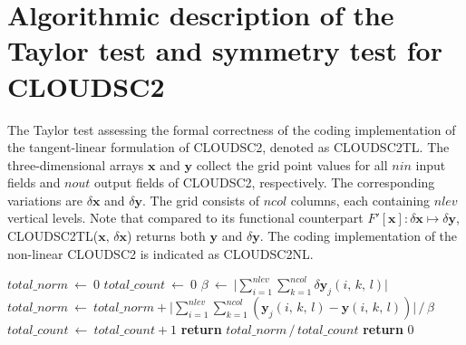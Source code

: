 \documentclass[main.tex]{subfiles}
\begin{document}
    \section{Algorithmic description of the Taylor test and symmetry test for CLOUDSC2}
    \label{section:appendix}


    \begin{algorithm}[H]
        \caption{The Taylor test assessing the formal correctness of the coding implementation of the tangent-linear formulation of CLOUDSC2, denoted as \textsc{CLOUDSC2TL}. The three-dimensional arrays $\mathbf{x}$ and $\mathbf{y}$ collect the grid point values for all $nin$ input fields and $nout$ output fields of CLOUDSC2, respectively. The corresponding variations are $\delta \mathbf{x}$ and $\delta \mathbf{y}$. The grid consists of $ncol$ columns, each containing $nlev$ vertical levels. Note that compared to its functional counterpart $F' \left[\boldsymbol{x} \right] : \delta \boldsymbol{x} \mapsto \delta \boldsymbol{y}$, \textsc{CLOUDSC2TL($\mathbf{x}, \, \delta \mathbf{x}$)} returns both $\mathbf{y}$ and $\delta \mathbf{y}$. The coding implementation of the non-linear CLOUDSC2 is indicated as \textsc{CLOUDSC2NL}.}
        \label{alg:taylor-test}

        \begin{algorithmic}[1]
             
                \State $total\_norm ~ \gets ~ 0$
                \State $total\_count ~ \gets ~ 0$
                    \State $\beta ~ \gets ~ \big| \sum_{i=1}^{nlev} \sum_{k=1}^{ncol} \delta \mathbf{y}_j \left( i, \, k, \, l \right) \big|$
                        \State $total\_norm ~ \gets ~ total\_norm + \big| \sum_{i=1}^{nlev} \sum_{k=1}^{ncol} \left( \mathbf{y}_j \left( i, \, k, \, l \right) - \mathbf{y} \left( i, \, k, \, l \right) \right) \big| \, / \, \beta$
                        \State $total\_count ~ \gets ~ total\_count + 1$
                    \EndIf
                \EndFor
                    \State \textbf{return} $total\_norm \, / \, total\_count$
                \Else
                    \State \textbf{return} 0
                \EndIf
            \EndFunction


\end{algorithmic}
\end{algorithm}
\end{document}

